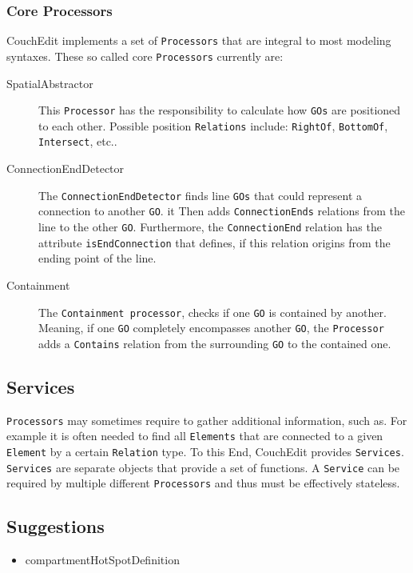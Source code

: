 \subsubsection{Core Processors}
CouchEdit implements a set of \texttt{Processors} that are integral to most modeling syntaxes. These so called core \texttt{Processors} currently are: 
\begin{description}
  \item[SpatialAbstractor] This \texttt{Processor} has the responsibility to calculate how \texttt{GOs} are positioned to each other. Possible position \texttt{Relations} include: \texttt{RightOf}, \texttt{BottomOf}, \texttt{Intersect}, etc..
  \item[ConnectionEndDetector] The \texttt{ConnectionEndDetector} finds line \texttt{GOs} that could represent a connection to another \texttt{GO}. it Then adds \texttt{ConnectionEnds} relations from the line to the other \texttt{GO}. Furthermore, the \texttt{ConnectionEnd} relation has the attribute \texttt{isEndConnection} that defines, if this relation origins from the ending point of the line.
  \item[Containment] The \texttt{Containment processor}, checks if one \texttt{GO} is contained by another. Meaning, if one \texttt{GO} completely encompasses another \texttt{GO}, the \texttt{Processor} adds a \texttt{Contains} relation from the surrounding \texttt{GO} to the contained one.
\end{description}

\subsection{Services}
\texttt{Processors} may sometimes require to gather additional information, such as. For example it is often needed to find all \texttt{Elements} that are connected to a given \texttt{Element} by a certain \texttt{Relation} type.
To this End, CouchEdit provides \texttt{Services}. \texttt{Services} are separate objects that provide a set of functions. A \texttt{Service} can be required by multiple different \texttt{Processors} and thus must be effectively stateless.



\subsection{Suggestions}

\begin{itemize}
  \item compartmentHotSpotDefinition
\end{itemize}

